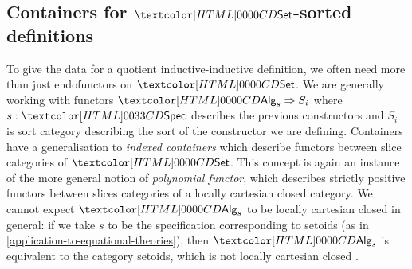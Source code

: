 \subsection{Containers for $\Set$-sorted definitions}
To give the data for a quotient inductive-inductive definition, we
often need more than just endofunctors on $\Set$. We are generally
working with functors $\Func{\Alg_s}{S_i}$ where $s : \specty$
describes the previous constructors and $S_i$ is sort category
describing the sort of the constructor we are defining. Containers
have a generalisation to \emph{indexed containers} which describe
functors between slice categories of $\Set$. This concept is again an
instance of the more general notion of \emph{polynomial functor},
which describes strictly positive functors between slices categories
of a locally cartesian closed category. We cannot expect $\Alg_s$ to
be locally cartesian closed in general: if we take $s$ to be the
specification corresponding to setoids (as in
\cref{application-to-equational-theories}), then $\Alg_s$ is equivalent
to the category setoids, which is not locally cartesian closed
\cite{Altenkirch2012}.

